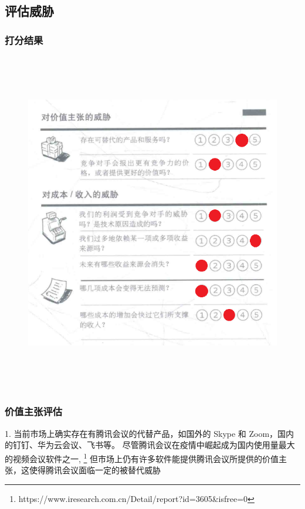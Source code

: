 \documentclass[a4paper,12pt]{article}
\begin{document}
    \subsection{评估威胁}\label{subsec:threat}
    \subsubsection{打分结果}
    \begin{figure}[htbp]
        \centering
        \includegraphics[width=15cm,height=15cm]{png/评估威胁}
    \end{figure}
    \clearpage %

    \subsubsection{价值主张评估}

    1.
    当前市场上确实存在有腾讯会议的代替产品，如国外的 Skype 和 Zoom，国内的钉钉、华为云会议、飞书等。
    尽管腾讯会议在疫情中崛起成为国内使用量最大的视频会议软件之一,
    \footnote{https://www.iresearch.com.cn/Detail/report?id=3605\&isfree=0}
    但市场上仍有许多软件能提供腾讯会议所提供的价值主张，这使得腾讯会议面临一定的被替代威胁
\end{document}
